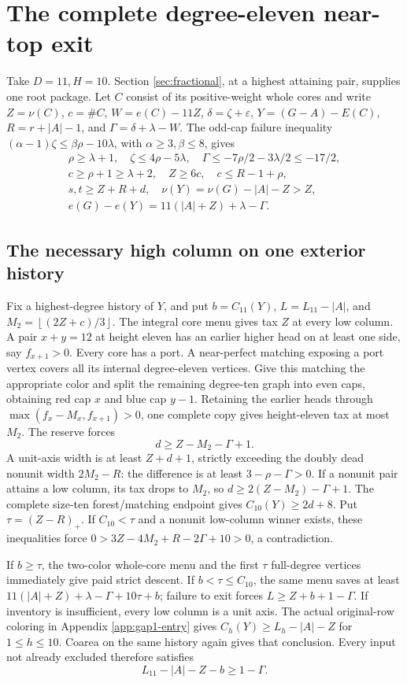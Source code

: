 \documentclass[11pt,a4paper]{article}
\newcommand{\floor}[1]{\left\lfloor#1\right\rfloor}
\theoremstyle{definition}
\begin{document}
\section{The complete degree-eleven near-top exit}\label{app:D11}
Take $D=11,H=10$. Section \ref{sec:fractional}, at a highest attaining pair, supplies one root package. Let $C$ consist of its positive-weight whole cores and write
$Z=\nu(C)$, $c=\#C$, $W=e(C)-11Z$, $\delta=\zeta+\varepsilon$,
$Y=(G-A)-E(C)$, $R=r+|A|-1$, and $\Gamma=\delta+\lambda-W$.
The odd-cap failure inequality $(\alpha-1)\zeta\le\beta\rho-10\lambda$, with $\alpha\ge3,\beta\le8$, gives
\begin{gather}
\rho\ge\lambda+1,\quad \zeta\le4\rho-5\lambda,\quad
\Gamma\le-7\rho/2-3\lambda/2\le-17/2, \label{eq:D11debt}\\
c\ge\rho+1\ge\lambda+2,\quad Z\ge6c,\quad c\le R-1+\rho,\\
s,t\ge Z+R+d,\quad \nu(Y)=\nu(G)-|A|-Z>Z,\\
e(G)-e(Y)=11(|A|+Z)+\lambda-\Gamma.
\end{gather}
\subsection{The necessary high column on one exterior history}
Fix a highest-degree history of $Y$, and put $b=C_{11}(Y)$, $L=L_{11}-|A|$, and $M_2=\floor{(2Z+c)/3}$. The integral core menu gives tax $Z$ at every low column. A pair $x+y=12$ at height eleven has an earlier higher head on at least one side, say $f_{x+1}>0$. Every core has a port. A near-perfect matching exposing a port vertex covers all its internal degree-eleven vertices. Give this matching the appropriate color and split the remaining degree-ten graph into even caps, obtaining red cap $x$ and blue cap $y-1$. Retaining the earlier heads through
$\max(f_x-M_x,f_{x+1})>0$, one complete copy gives height-eleven tax at most $M_2$. The reserve forces
\[
d\ge Z-M_2-\Gamma+1.
\]
A unit-axis width is at least $Z+d+1$, strictly exceeding the doubly dead nonunit width $2M_2-R$: the difference is at least $3-\rho-\Gamma>0$. If a nonunit pair attains a low column, its tax drops to $M_2$, so
$d\ge2(Z-M_2)-\Gamma+1$.
The complete size-ten forest/matching endpoint gives $C_{10}(Y)\ge2d+8$.
Put $\tau=(Z-R)_+$. If $C_{10}<\tau$ and a nonunit low-column winner exists, these inequalities force
$0>3Z-4M_2+R-2\Gamma+10>0$, a contradiction.

If $b\ge\tau$, the two-color whole-core menu and the first $\tau$ full-degree vertices immediately give paid strict descent. If $b<\tau\le C_{10}$, the same menu saves at least
$11(|A|+Z)+\lambda-\Gamma+10\tau+b$; failure to exit forces
$L\ge Z+b+1-\Gamma$. If inventory is insufficient, every low column is a unit axis. The actual original-row coloring in Appendix \ref{app:gap1-entry} gives $C_h(Y)\ge L_h-|A|-Z$ for $1\le h\le10$. Coarea on the same history again gives that conclusion. Every input not already excluded therefore satisfies
\begin{equation}\label{eq:D11lower}
L_{11}-|A|-Z-b\ge1-\Gamma.
\end{equation}
\end{document}
